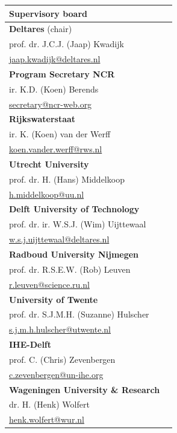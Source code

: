 \begin{table}
\begin{tabular}[t]{ll}
		\end{tabular}
    \begin{tabular}[t]{ll}
        \textbf{Supervisory board}\\
        \hline
        \textbf{Deltares} (chair) \\
           prof. dr. J.C.J. (Jaap) Kwadijk \\ 
           \url{jaap.kwadijk@deltares.nl} \\
        \textbf{Program Secretary NCR} \\
            ir. K.D. (Koen) Berends\\
            \url{secretary@ncr-web.org} \\
       \textbf{Rijkswaterstaat} \\
           ir. K. (Koen) van der Werff\\
           \url{koen.vander.werff@rws.nl} \\
       \textbf{Utrecht University} \\
            prof. dr. H. (Hans) Middelkoop \\ 
           \url{h.middelkoop@uu.nl} \\
       \textbf{Delft University of Technology} \\
            prof. dr. ir. W.S.J. (Wim) Uijttewaal \\ 
            \url{w.s.j.uijttewaal@deltares.nl} \\
       \textbf{Radboud University Nijmegen} \\
            prof. dr. R.S.E.W. (Rob) Leuven \\
            \url{r.leuven@science.ru.nl}\\
       \textbf{University of Twente} \\
            prof. dr. S.J.M.H. (Suzanne) Hulscher \\
            \url{s.j.m.h.hulscher@utwente.nl}\\
       \textbf{IHE-Delft} \\
            prof. C. (Chris) Zevenbergen \\
            \url{c.zevenbergen@un-ihe.org}\\
        \textbf{Wageningen University \& Research}\\
            dr. H. (Henk) Wolfert \\
            \url{henk.wolfert@wur.nl}\\

    \end{tabular}
	\end{table}



